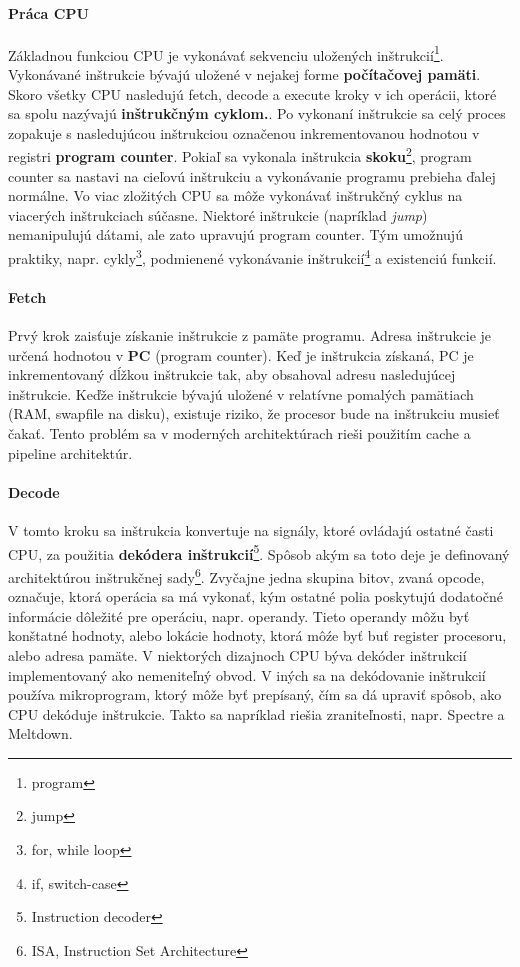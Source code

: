 \documentclass[11pt,a4paper]{report}
\begin{document}
\paragraph{Práca CPU} Základnou funkciou CPU je vykonávať sekvenciu uložených inštrukcií\footnote{program}. Vykonávané inštrukcie bývajú uložené v nejakej forme \textbf{počítačovej pamäti}. Skoro všetky CPU nasledujú fetch, decode a execute kroky v ich operácii, ktoré sa spolu nazývajú \textbf{inštrukčným cyklom.}. Po vykonaní inštrukcie sa celý proces zopakuje s nasledujúcou inštrukciou označenou inkrementovanou hodnotou v registri \textbf{program counter}. 
Pokiaľ sa vykonala inštrukcia \textbf{skoku}\footnote{jump}, program counter sa nastavi na cieľovú inštrukciu a vykonávanie programu prebieha ďalej normálne. Vo viac zložitých CPU sa môže vykonávať inštrukčný cyklus na viacerých inštrukciach súčasne. Niektoré inštrukcie (napríklad \textit{jump}) nemanipulujú dátami, ale zato upravujú program counter. Tým umožnujú praktiky, napr. cykly\footnote{for, while loop}, podmienené vykonávanie inštrukcií\footnote{if, switch-case} a existenciú funkcií.

\paragraph{Fetch} Prvý krok zaisťuje získanie inštrukcie z pamäte programu. Adresa inštrukcie je určená hodnotou v \textbf{PC} (program counter). Keď je inštrukcia získaná, PC je inkrementovaný dĺžkou inštrukcie tak, aby obsahoval adresu nasledujúcej inštrukcie. Keďže inštrukcie bývajú uložené v relatívne pomalých pamätiach (RAM, swapfile na disku), existuje riziko, že procesor bude na inštrukciu musieť čakať. Tento problém sa v moderných architektúrach rieši použitím cache a pipeline architektúr.

\paragraph{Decode} V tomto kroku sa inštrukcia konvertuje na signály, ktoré ovládajú ostatné časti CPU, za použitia \textbf{dekódera inštrukcií}\footnote{Instruction decoder}. Spôsob akým sa toto deje je definovaný architektúrou inštrukčnej sady\footnote{ISA, Instruction Set Architecture}. Zvyčajne jedna skupina bitov, zvaná opcode, označuje, ktorá operácia sa má vykonať, kým ostatné polia poskytujú dodatočné informácie dôležité pre operáciu, napr. operandy. Tieto operandy môžu byť konštatné hodnoty, alebo lokácie hodnoty, ktorá môźe byť buť register procesoru, alebo adresa pamäte. V niektorých dizajnoch CPU býva dekóder inštrukcií implementovaný ako nemeniteľný obvod. V iných sa na dekódovanie inštrukcií používa mikroprogram, ktorý môže byť prepísaný, čím sa dá upraviť spôsob, ako CPU dekóduje inštrukcie. Takto sa napríklad riešia zraniteľnosti, napr. Spectre a Meltdown.
\end{document}
